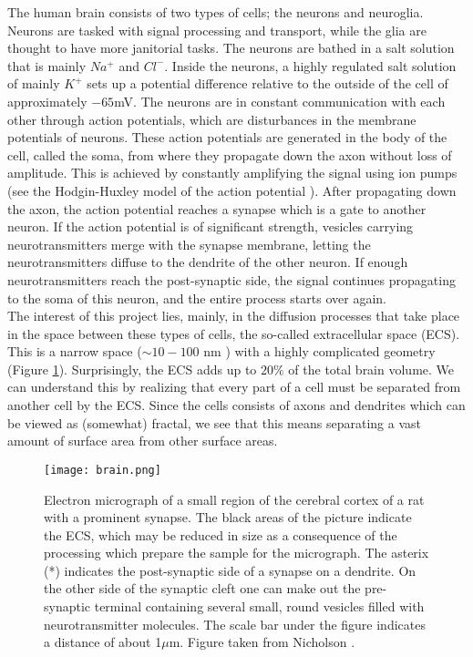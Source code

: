 \documentclass[a4paper,english, 12pt, twoside]{article}
\begin{document}
The human brain consists of two types of cells; the neurons and neuroglia. 
Neurons are tasked with signal processing and transport, while the glia are thought to have more janitorial tasks. 
The neurons are bathed in a salt solution that is mainly $Na^+$ and $Cl^-$. 
Inside the neurons, a highly regulated salt solution of mainly $K^+$ sets up a potential difference relative to the outside of the cell of approximately $-65$mV.
The neurons are in constant communication with each other through action potentials, which are disturbances in the membrane potentials of neurons. 
These action potentials are generated in the body of the cell, called the soma, from where they propagate down the axon without loss of amplitude. 
This is achieved by constantly amplifying the signal using ion pumps (see the Hodgin-Huxley model of the action potential \cite{sterratt2011principles}).
After propagating down the axon, the action potential reaches a synapse which is a gate to another neuron. 
If the action potential is of significant strength, vesicles carrying neurotransmitters merge with the synapse membrane, letting the neurotransmitters diffuse to the dendrite of the other neuron. 
If enough neurotransmitters reach the post-synaptic side, the signal continues propagating to the soma of this neuron, and the entire process starts over again. \\
The interest of this project lies, mainly, in the diffusion processes that take place in the space between these types of cells, the so-called extracellular space (ECS). 
This is a narrow space ($\sim 10-100$ nm \cite{nicholson2001diffusion}) with a highly complicated geometry (Figure \ref{ECS}). 
Surprisingly, the ECS adds up to $20\%$ of the total brain volume. 
We can understand this by realizing that every part of a cell must be separated from another cell by the ECS. 
Since the cells consists of axons and dendrites which can be viewed as (somewhat) fractal, we see that this means separating a vast amount of surface area from other surface areas.

\begin{figure}[H]
 \centering
 \texttt{[image: brain.png]}
 \caption{Electron micrograph of a small region of the cerebral cortex of a rat with a prominent synapse. 
 The black areas of the picture indicate the ECS, which may be reduced in size as a consequence of the processing which prepare the sample for the micrograph. 
 The asterix (*) indicates the post-synaptic side of a synapse on a dendrite. 
 On the other side of the synaptic cleft one can make out the pre-synaptic terminal containing several small, round vesicles filled with neurotransmitter molecules. 
 The scale bar under the figure indicates a distance of about 1$\mu$m. 
 Figure taken from Nicholson \cite{nicholson2001diffusion}.}
 \label{ECS}
\end{figure}
\end{document}
